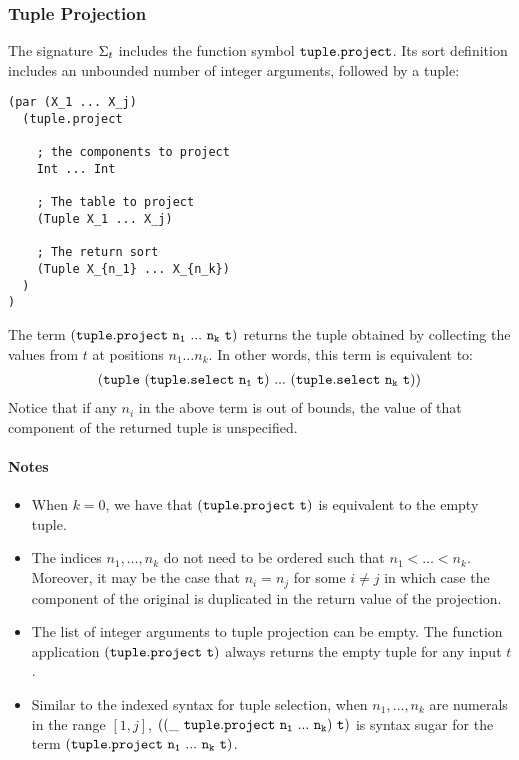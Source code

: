 \documentclass[english,a4paper,10pt]{article}
\begin{document}
\subsubsection{Tuple Projection}
\label{sec:tup-project}
The signature $\Sigma_{t}$ includes 
the function symbol ${\tt tuple.project}$.
Its sort definition includes an unbounded number of integer arguments, followed
by a tuple:
\begin{verbatim}
(par (X_1 ... X_j) 
  (tuple.project
    
    ; the components to project
    Int ... Int
  
    ; The table to project
    (Tuple X_1 ... X_j)
    
    ; The return sort
    (Tuple X_{n_1} ... X_{n_k})
  )
)
\end{verbatim}
The term
$\syntax{(tuple.project\ n_1\ ...\ n_k\ t)}$
returns the tuple obtained by collecting the
values from $t$ at positions $n_1 \ldots n_k$.
In other words, this term is equivalent to:
\begin{align*}
{\tt (tuple\ (tuple.select\ n_1\ t)\ ...\ (tuple.select\ n_k\ t))}
\end{align*}
Notice that if any $n_i$ in the above term is out of bounds, the value of
that component of the returned tuple is unspecified.

\paragraph{Notes}
\begin{itemize}
\item
When $k=0$,
we have that $\syntax{(tuple.project\ t)}$ is equivalent to the empty tuple.
\item
The indices $n_1, \ldots, n_k$ do not need to be ordered such that $n_1 < \ldots < n_k$.
Moreover, it may be the case that $n_i = n_j$ for some $i \neq j$ in which
case the component of the original is duplicated in the return value of the projection.
\item
The list of integer arguments to tuple projection can be empty.
The function application
$\syntax{(tuple.project\ t)}$ always returns the empty tuple for any input $t$.
\item Similar to the indexed syntax for tuple selection,
when $n_1, \ldots, n_k$ are numerals in the range $[1, j]$,
$\syntax{((\_\ tuple.project\ n_1\ ...\ n_k)\ t)}$ is syntax sugar for the term
$\syntax{(tuple.project\ n_1\ ...\ n_k\ t)}$.
\end{itemize}
\end{document}
